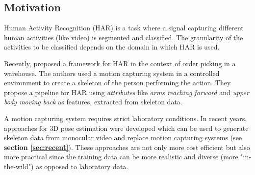 \documentclass[twoside]{article}
\begin{document}
\begin{multicols}{2} %

\section{Motivation}
\label{sec:motivation}







Human Activity Recognition (HAR) is a task where a signal capturing different human activities (like video) is segmented and classified.
The granularity of the activities to be classified depends on the domain in which HAR is used. 

Recently,\cite{reining_towards_2018} proposed a framework for HAR in the context of order picking in a warehouse.
The authors used a motion capturing system in a controlled environment to create a skeleton of the person performing the action.
They propose a pipeline for HAR using \textit{attributes} like \textit{arms reaching forward} and \textit{upper body moving back} as features, extracted from skeleton data.

A motion capturing system requires strict laboratory conditions.
In recent years, approaches for 3D pose estimation were developed which can be used to generate skeleton data from monocular video and replace motion capturing systems (see \textbf{section \ref{sec:recent}}).
These approaches are not only more cost efficient but also more practical since the training data can be more realistic and diverse (more "in-the-wild") as opposed to laboratory data.


\end{multicols}
\end{document}
